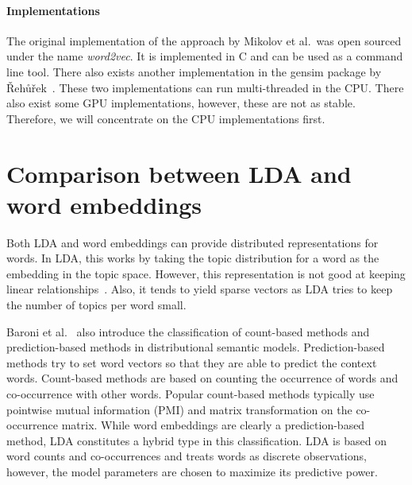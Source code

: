 \documentclass[
        a4paper,
        titlepage,
        twoside,
        parskip
        ]{scrbook}
\theoremstyle{break}
\begin{document}
\paragraph{Implementations}
The original implementation of the approach by Mikolov et al.~was open sourced under the name \emph{word2vec}.
It is implemented in C and can be used as a command line tool.
There also exists another implementation in the gensim package by {\v R}eh{\r u}{\v r}ek~\cite{Rehurek2010}.
These two implementations can run multi-threaded in the CPU.
There also exist some GPU implementations, however, these are not as stable.
Therefore, we will concentrate on the CPU implementations first.

\section{Comparison between LDA and word embeddings}


Both LDA and word embeddings can provide distributed representations for words.
In LDA, this works by taking the topic distribution for a word as the embedding in the topic space.
However, this representation is not good at keeping linear relationships~\cite{Mikolov2013b,Mikolov2013a}.
Also, it tends to yield sparse vectors as LDA tries to keep the number of topics per word small.

Baroni et al.~\cite{Baroni2014} also introduce the classification of count-based methods and prediction-based methods in distributional semantic models.
Prediction-based methods try to set word vectors so that they are able to predict the context words.
Count-based methods are based on counting the occurrence of words and co-occurrence with other words.
Popular count-based methods typically use pointwise mutual information (PMI) and matrix transformation on the co-occurrence matrix.
While word embeddings are clearly a prediction-based method, LDA constitutes a hybrid type in this classification.
LDA is based on word counts and co-occurrences and treats words as discrete observations, however, the model parameters are chosen to maximize its predictive power.
\end{document}
